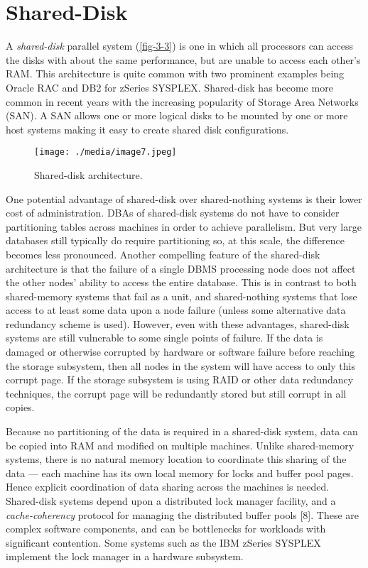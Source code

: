 \documentclass[b5paper,11pt,twoside,openright]{book}
\begin{document}
\hypertarget{shared-disk}{%
\section{Shared-Disk}\label{shared-disk}}

A \emph{shared-disk} parallel system (\autoref{fig-3-3}) is one in which all
processors can access the disks with about the same performance, but are
unable to access each other's RAM. This architecture is quite common
with two prominent examples being Oracle RAC and DB2 for zSeries
SYSPLEX. Shared-disk has become more common in recent years with the
increasing popularity of Storage Area Networks (SAN). A SAN allows one
or more logical disks to be mounted by one or more host systems making
it easy to create shared disk configurations.

\begin{figure}
\centering
\texttt{[image: ./media/image7.jpeg]}

\caption{Shared-disk architecture.\label{fig-3-3}}
\end{figure}

One potential advantage of shared-disk over shared-nothing systems is
their lower cost of administration. DBAs of shared-disk systems do not
have to consider partitioning tables across machines in order to achieve
parallelism. But very large databases still typically do require
partitioning so, at this scale, the difference becomes less pronounced.
Another compelling feature of the shared-disk architecture is that the
failure of a single DBMS processing node does not affect the other
nodes' ability to access the entire database. This is in contrast to
both shared-memory systems that fail as a unit, and shared-nothing
systems that lose access to at least some data upon a node failure
(unless some alternative data redundancy scheme is used). However, even
with these advantages, shared-disk systems are still vulnerable to some
single
points of failure. If the data is damaged or otherwise corrupted by
hardware or software failure before reaching the storage subsystem,
then all nodes in the system will have access to only this corrupt page.
If the storage subsystem is using RAID or other data redundancy
techniques, the corrupt page will be redundantly stored but still
corrupt in all copies.

Because no partitioning of the data is required in a shared-disk system,
data can be copied into RAM and modified on multiple machines. Unlike
shared-memory systems, there is no natural memory location to coordinate
this sharing of the data --- each machine has its own local memory for
locks and buffer pool pages. Hence explicit coordination of data sharing
across the machines is needed. Shared-disk systems depend upon a
distributed lock manager facility, and a \emph{cache-coherency} protocol
for managing the distributed buffer pools {[}8{]}. These are complex
software components, and can be bottlenecks for workloads with
significant contention. Some systems such as the IBM zSeries SYSPLEX
implement the lock manager in a hardware subsystem.
\end{document}
